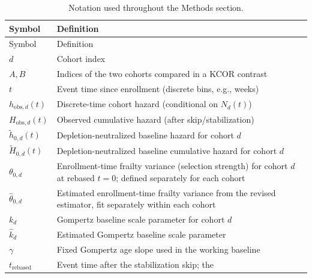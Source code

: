 \documentclass[
]{article}
\begin{document}
\begin{longtable}[]{@{}
  >{\raggedright\arraybackslash}p{}
  >{\raggedright\arraybackslash}p{}@{}}
\caption{Notation used throughout the Methods
section.}\label{tbl:notation}\tabularnewline
\toprule\noalign{}
\begin{minipage}[b]{\linewidth}\raggedright
Symbol
\end{minipage} & \begin{minipage}[b]{\linewidth}\raggedright
Definition
\end{minipage} \\
\midrule\noalign{}
\endfirsthead
\toprule\noalign{}
\begin{minipage}[b]{\linewidth}\raggedright
Symbol
\end{minipage} & \begin{minipage}[b]{\linewidth}\raggedright
Definition
\end{minipage} \\
\midrule\noalign{}
\endhead
\bottomrule\noalign{}
\endlastfoot
\(d\) & Cohort index \\
\(A,B\) & Indices of the two cohorts compared in a KCOR contrast \\
\(t\) & Event time since enrollment (discrete bins, e.g., weeks) \\
\(h_{\mathrm{obs},d}(t)\) & Discrete-time cohort hazard (conditional on
\(N_d(t)\)) \\
\(H_{\mathrm{obs},d}(t)\) & Observed cumulative hazard (after
skip/stabilization) \\
\(\tilde h_{0,d}(t)\) & Depletion-neutralized baseline hazard for cohort
\(d\) \\
\(\tilde H_{0,d}(t)\) & Depletion-neutralized baseline cumulative hazard
for cohort \(d\) \\
\(\theta_{0,d}\) & Enrollment-time frailty variance (selection strength)
for cohort \(d\) at rebased \(t=0\); defined separately for each
cohort \\
\(\hat{\theta}_{0,d}\) & Estimated enrollment-time frailty variance from
the revised estimator, fit separately within each cohort \\
\(k_d\) & Gompertz baseline scale parameter for cohort \(d\) \\
\(\hat{k}_d\) & Estimated Gompertz baseline scale parameter \\
\(\gamma\) & Fixed Gompertz age slope used in the working baseline \\
\(t_{\mathrm{rebased}}\) & Event time after the stabilization skip; the

\end{longtable}
\end{document}

